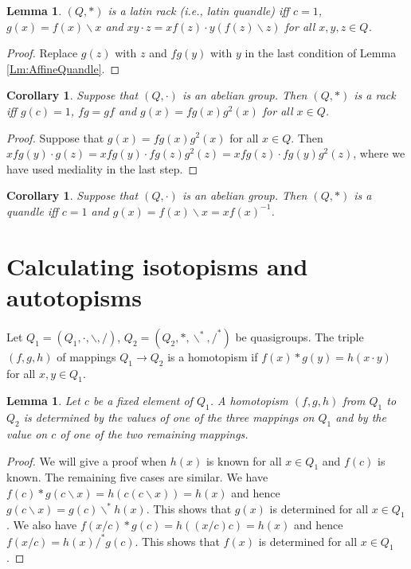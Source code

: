 \documentclass{amsart}
\def\rdiv{/}
\def\ldiv{\backslash}
\def\isordiv{/^*}
\def\isoldiv{\backslash^*}
\theoremstyle{plain}
\newtheorem{corollary}[theorem]{Corollary}
\newtheorem{lemma}[theorem]{Lemma}
\theoremstyle{definition}
\begin{document}
\begin{lemma}\label{Lm:AffineLatinQuandle}
$(Q,*)$ is a latin rack (i.e., latin quandle) iff $c=1$, $g(x)=f(x)\ldiv x$ and $xy\cdot z = xf(z)\cdot y(f(z)\ldiv z)$ for all $x,y,z\in Q$.
\end{lemma}
\begin{proof}
Replace $g(z)$ with $z$ and $fg(y)$ with $y$ in the last condition of Lemma \ref{Lm:AffineQuandle}.
\end{proof}

\begin{corollary}
Suppose that $(Q,\cdot)$ is an abelian group. Then $(Q,*)$ is a rack iff $g(c)=1$, $fg=gf$ and $g(x)=fg(x)g^2(x)$ for all $x\in Q$.
\end{corollary}
\begin{proof}
Suppose that $g(x)=fg(x)g^2(x)$ for all $x\in Q$. Then $xfg(y)\cdot g(z) = xfg(y)\cdot fg(z)g^2(z) =  xfg(z)\cdot fg(y)g^2(z)$, where we have used mediality in the last step.
\end{proof}

\begin{corollary}
Suppose that $(Q,\cdot)$ is an abelian group. Then $(Q,*)$ is a quandle iff $c=1$ and $g(x)=f(x)\ldiv x = xf(x)^{-1}$.
\end{corollary}

\section{Calculating isotopisms and autotopisms}

Let $Q_1 = (Q_1,\cdot,\ldiv,\rdiv)$, $Q_2=(Q_2,*,\isoldiv,\isordiv)$ be quasigroups. The triple $(f,g,h)$ of mappings $Q_1\to Q_2$ is a homotopism if $f(x)*g(y) = h(x\cdot y)$ for all $x,y\in Q_1$.

\begin{lemma}
Let $c$ be a fixed element of $Q_1$. A homotopism $(f,g,h)$ from $Q_1$ to $Q_2$ is determined by the values of one of the three mappings on $Q_1$ and by the value on $c$ of one of the two remaining mappings.
\end{lemma}
\begin{proof}
We will give a proof when $h(x)$ is known for all $x\in Q_1$ and $f(c)$ is known. The remaining five cases are similar.
We have $f(c)*g(c\ldiv x) = h(c(c\ldiv x)) = h(x)$ and hence $g(c\ldiv x) = g(c)\isoldiv h(x)$. This shows that $g(x)$ is determined for all $x\in Q_1$. We also have $f(x\rdiv c)*g(c) = h((x\rdiv c)c) = h(x)$ and hence $f(x\rdiv c) = h(x)\isordiv g(c)$. This shows that $f(x)$ is determined for all $x\in Q_1$.
\end{proof}
\end{document}
